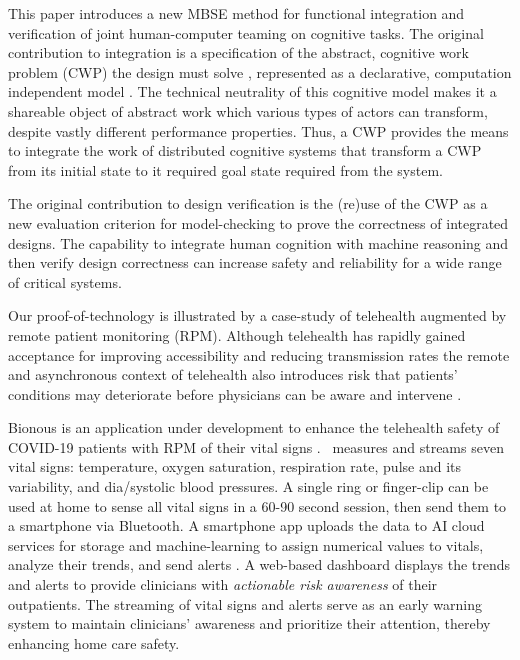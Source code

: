 This paper introduces a new MBSE method for functional integration and verification of joint human-computer teaming on cognitive tasks. 
The original contribution to integration is a specification of the abstract, cognitive work problem (CWP) the design must solve \cite{workflowmodel,workcentered,BERRY201615,chi2010}, represented as a declarative, computation independent model \cite{Garrido}.
The technical neutrality of this cognitive model makes it a shareable object of abstract work which various types of actors can transform, despite vastly different performance properties.
Thus, a CWP provides the means to integrate the work of distributed cognitive systems that transform a CWP from its initial state to it required goal state required from the system.

The original contribution to design verification is the (re)use of the CWP as a new evaluation criterion for model-checking to prove the correctness of integrated designs.
The capability to integrate human cognition with machine reasoning and then verify design correctness can increase safety and reliability for a wide range of critical systems.

Our proof-of-technology is illustrated by a case-study of telehealth augmented by remote patient monitoring (RPM). 
Although telehealth has rapidly gained acceptance for improving accessibility \cite{Medicare} and reducing transmission rates \cite{10.1093/jamia/ocaa067} the remote and asynchronous context of telehealth also introduces risk that patients' conditions may deteriorate before physicians can be aware and intervene \cite{10.1097/ALN.0000000000003578}.

Bionous \phware is an application under development to enhance the telehealth safety of COVID-19 patients with RPM of their vital signs \cite{Phware}.
\phware\ measures and streams seven vital signs: temperature, oxygen saturation, respiration rate, pulse and its variability, and dia/systolic blood pressures.
A single \phware ring or finger-clip can be used at home to sense all vital signs in a 60-90 second session, then send them to a smartphone via Bluetooth.
A smartphone app uploads the data to AI cloud services for storage and machine-learning to assign numerical values to vitals, analyze their trends, and send alerts \cite{Altschul2004PredictiveMI,10.2307/2984877,10.5555/1643031.1643047}.
A web-based dashboard displays the trends and alerts to provide clinicians with \emph{actionable risk awareness} of their outpatients.
The streaming of vital signs and alerts serve as an early warning system to maintain clinicians’ awareness and prioritize their attention, thereby enhancing home care safety.

